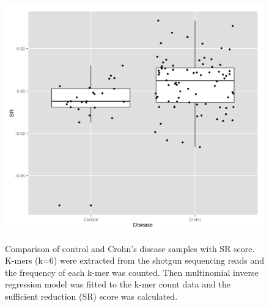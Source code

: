 \begin{figure}[p]
\centering
{\includegraphics[scale=0.25,trim=0 0 0 0,clip]{Figure/F51_SR_control_disease.png}
}
\caption[Comparison of control and Crohn's disease samples with SR score]{Comparison of control and Crohn's disease samples with SR score. K-mers (k=6) were extracted from the shotgun sequencing reads and the frequency of each k-mer was counted. Then multinomial inverse regression model was fitted to the k-mer count data and the sufficient reduction (SR) score was calculated.   
}
\label{F51_SR_control_disease}
\end{figure}



